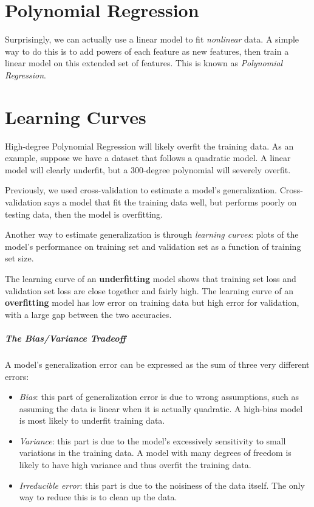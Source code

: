 \documentclass[letterpaper]{article}
\begin{document}
\section{Polynomial Regression}
Surprisingly, we can actually use a linear model to fit \textsl{nonlinear} data. A simple way to do this is to add powers of each feature as new features, then train a linear model on this extended set of features. This is known as \textsl{Polynomial Regression}. 

\section{Learning Curves}
High-degree Polynomial Regression will likely overfit the training data. As an example, suppose we have a dataset that follows a quadratic model. A linear model will clearly underfit, but a 300-degree polynomial will severely overfit. 

Previously, we used cross-validation to estimate a model's generalization. Cross-validation says a model that fit the training data well, but performs poorly on testing data, then the model is overfitting. 

Another way to estimate generalization is through \textsl{learning curves}: plots of the model's performance on training set and validation set as a function of training set size. 

The learning curve of an \textbf{underfitting} model shows that training set loss and validation set loss are close together and fairly high. The learning curve of an \textbf{overfitting} model has low error on training data but high error for validation, with a large gap between the two accuracies. 

\subparagraph{The Bias/Variance Tradeoff}
A model's generalization error can be expressed as the sum of three very different errors:
\begin{itemize}
	\item \textsl{Bias}: this part of generalization error is due to wrong assumptions, such as assuming the data is linear when it is actually quadratic. A high-bias model is most likely to underfit training data. 
	
	\item \textsl{Variance}: this part is due to the model's excessively sensitivity to small variations in the training data. A model with many degrees of freedom is likely to have high variance and thus overfit the training data. 
	
	\item \textsl{Irreducible error}: this part is due to the noisiness of the data itself. The only way to reduce this is to clean up the data. 
\end{itemize}
\end{document}
